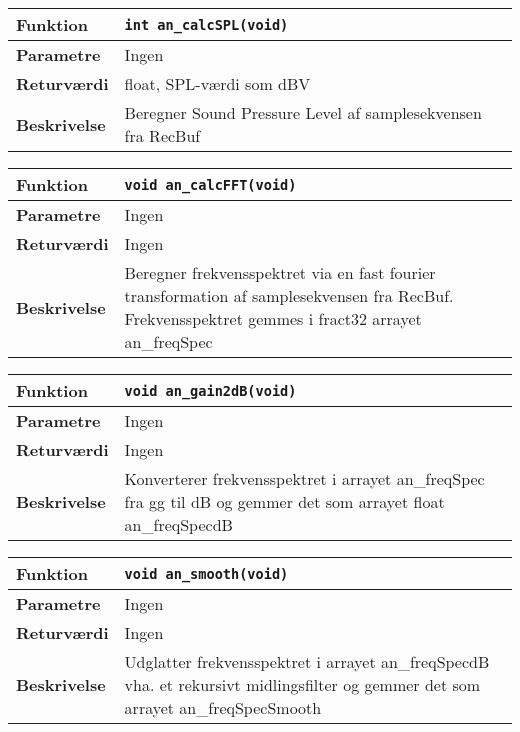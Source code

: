 \begin{center}
    \begin{tabular}{ | l | p{} |}
    \hline
    \textbf{Funktion}	& \verb+int an_calcSPL(void) +						\\ \hline
    \textbf{Parametre} 	& Ingen		\\ \hline
    \textbf{Returværdi}	& float, SPL-værdi som dBV							\\ \hline
    \textbf{Beskrivelse}& Beregner Sound Pressure Level af samplesekvensen fra RecBuf \\ \hline
    \end{tabular}
\end{center} 

\begin{center}
    \begin{tabular}{ | l | p{} |}
    \hline
    \textbf{Funktion}	& \verb+void an_calcFFT(void) +						\\ \hline
    \textbf{Parametre} 	& Ingen		\\ \hline
    \textbf{Returværdi}	& Ingen							\\ \hline
    \textbf{Beskrivelse}& Beregner frekvensspektret via en fast fourier transformation af samplesekvensen fra RecBuf. Frekvensspektret gemmes i fract32 arrayet an\_freqSpec\\ \hline
    \end{tabular}
\end{center}

\begin{center}
    \begin{tabular}{ | l | p{} |}
    \hline
    \textbf{Funktion}	& \verb+void an_gain2dB(void) +						\\ \hline
    \textbf{Parametre} 	& Ingen		\\ \hline
    \textbf{Returværdi}	& Ingen							\\ \hline
    \textbf{Beskrivelse}& Konverterer frekvensspektret i arrayet an\_freqSpec fra gg til dB og gemmer det som arrayet float an\_freqSpecdB \\ \hline
    \end{tabular}
\end{center}  

\begin{center}
    \begin{tabular}{ | l | p{} |}
    \hline
    \textbf{Funktion}	& \verb+void an_smooth(void) +						\\ \hline
    \textbf{Parametre} 	& Ingen		\\ \hline
    \textbf{Returværdi}	& Ingen							\\ \hline
    \textbf{Beskrivelse}& Udglatter frekvensspektret i arrayet an\_freqSpecdB vha. et rekursivt midlingsfilter og gemmer det som arrayet an\_freqSpecSmooth  \\ \hline
    \end{tabular}
\end{center}

